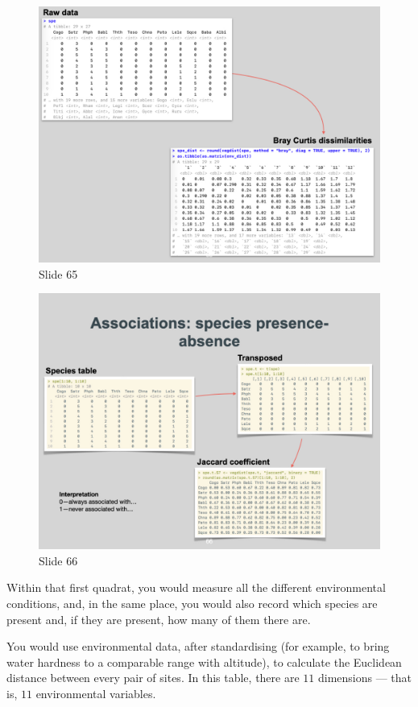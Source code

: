 \documentclass[
  10pt,
]{book}
\begin{document}
\begin{figure}[ht]
\centering
\includegraphics[width=0.8\linewidth]{../images/BDC334/BDC334-065.jpeg}
\caption*{Slide 65}
\end{figure}

\begin{figure}[ht]
\centering
\includegraphics[width=0.8\linewidth]{../images/BDC334/BDC334-066.jpeg}
\caption*{Slide 66}
\end{figure}

Within that first quadrat, you would measure all the different
environmental conditions, and, in the same place, you would also record
which species are present and, if they are present, how many of them
there are.

You would use environmental data, after standardising (for example, to
bring water hardness to a comparable range with altitude), to calculate
the Euclidean distance between every pair of sites. In this table, there
are \(11\) dimensions --- that is, \(11\) environmental variables.
\end{document}
